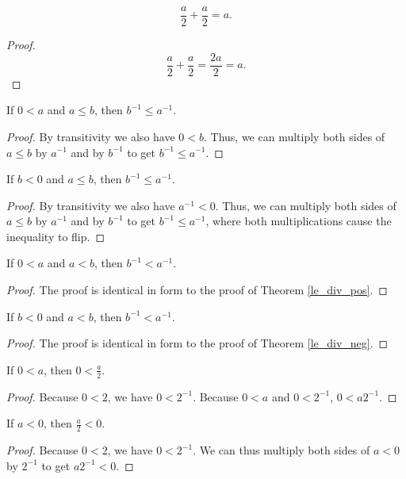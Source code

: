 \documentclass[../math.tex]{subfiles}
\begin{document}
\begin{theorem}
    \[
        \frac{a}{2} + \frac{a}{2} = a.
    \]
\end{theorem}
\begin{proof}
    \[
        \frac{a}{2} + \frac{a}{2} = \frac{2a}{2} = a.
    \]
\end{proof}

\begin{theorem} \label{le_div_pos}
    If $0 < a$ and $a \leq b$, then $b^{-1} \leq a^{-1}$.
\end{theorem}
\begin{proof}
    By transitivity we also have $0 < b$.  Thus, we can multiply both sides
    of $a \leq b$ by $a^{-1}$ and by $b^{-1}$ to get $b^{-1} \leq a^{-1}$.
\end{proof}

\begin{theorem} \label{le_div_neg}
    If $b < 0$ and $a \leq b$, then $b^{-1} \leq a^{-1}$.
\end{theorem}
\begin{proof}
    By transitivity we also have $a^{-1} < 0$.  Thus, we can multiply both sides
    of $a \leq b$ by $a^{-1}$ and by $b^{-1}$ to get $b^{-1} \leq a^{-1}$, where
    both multiplications cause the inequality to flip.
\end{proof}

\begin{theorem}
    If $0 < a$ and $a < b$, then $b^{-1} < a^{-1}$.
\end{theorem}
\begin{proof}
    The proof is identical in form to the proof of Theorem \ref{le_div_pos}.
\end{proof}

\begin{theorem}
    If $b < 0$ and $a < b$, then $b^{-1} < a^{-1}$.
\end{theorem}
\begin{proof}
    The proof is identical in form to the proof of Theorem \ref{le_div_neg}.
\end{proof}

\begin{theorem}
    If $0 < a$, then $0 < \frac{a}{2}$.
\end{theorem}
\begin{proof}
    Because $0 < 2$, we have $0 < 2^{-1}$.  Because $0 < a$ and $0 < 2^{-1}$, $0
    < a2^{-1}$.
\end{proof}

\begin{theorem}
    If $a < 0$, then $\frac{a}{2} < 0$.
\end{theorem}
\begin{proof}
    Because $0 < 2$, we have $0 < 2^{-1}$.  We can thus multiply both sides of
    $a < 0$ by $2^{-1}$ to get $a2^{-1} < 0$.
\end{proof}
\end{document}
